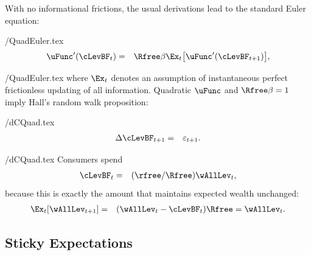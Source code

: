 With no informational frictions, the usual derivations lead to the standard Euler equation:
\begin{verbatimwrite}{\eq/QuadEuler.tex}
  \begin{eqnarray*}
    \uFunc^{\prime}(\cLevBF_{t}) & = & \Rfree\beta \Ex_{t}\big[\uFunc^{\prime}(\cLevBF_{t+1})\big], \label{eq:QuadEuler}
  \end{eqnarray*}
\end{verbatimwrite}
 \eq/QuadEuler.tex
where $\Ex_{t}$ denotes an assumption of instantaneous perfect frictionless updating of all information. Quadratic $\uFunc$ and $\Rfree \beta=1$ imply Hall's random walk proposition:
\begin{verbatimwrite}{\eq/dCQuad.tex}
  \begin{eqnarray*}
    \Delta \cLevBF_{t+1} & = & \varepsilon_{t+1} \label{eq:dCQuad}.
  \end{eqnarray*}
\end{verbatimwrite}
 \eq/dCQuad.tex
Consumers spend
\begin{eqnarray*}
  \cLevBF_{t} & = & (\rfree/\Rfree) \wAllLev_{t}, \label{eq:cquad}
\end{eqnarray*}
because this is exactly the amount that maintains expected wealth unchanged:
\begin{eqnarray*}
  \Ex_{t}[\wAllLev_{t+1}] & = & (\wAllLev_{t}-\cLevBF_{t})\Rfree = \wAllLev_{t}
                                .
\end{eqnarray*}


\subsection{Sticky Expectations}

